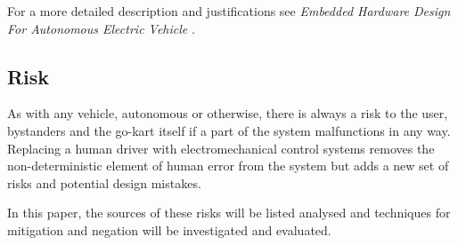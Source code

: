 For a more detailed description and justifications see \emph{Embedded Hardware Design For Autonomous Electric
Vehicle} \cite{jenkins_2011}.

\subsection{Risk}
As with any vehicle, autonomous or otherwise, there is always a risk to the user, bystanders and
 the go-kart itself if a part of the system malfunctions in any way. Replacing a human driver with 
 electromechanical control systems removes the non-deterministic element of human error 
 from the system but adds a new set of risks and potential design mistakes.
 
 In this paper, the sources of these risks will be listed analysed and techniques for mitigation and
 negation will be investigated and evaluated.


